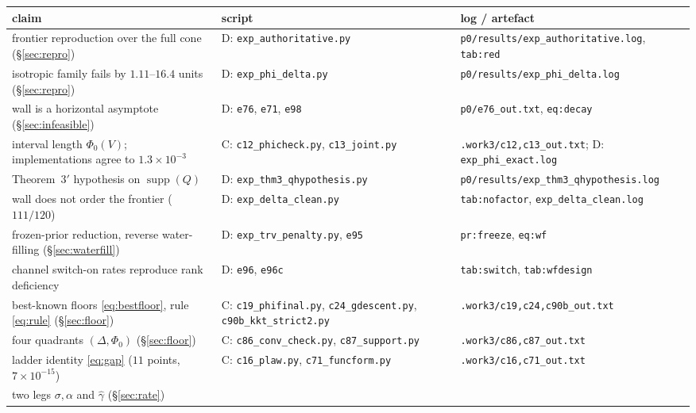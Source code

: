 \documentclass[journal]{IEEEtran}
\theoremstyle{remark}
\begin{document}
\begin{table}[t]\centering\scriptsize
\begin{tabular}{@{}>{\raggedright\arraybackslash}p{5.2cm}>{\raggedright\arraybackslash}p{5.6cm}>{\raggedright\arraybackslash}p{5.8cm}@{}}
\toprule
claim & script & log / artefact \\
\midrule
frontier reproduction over the full cone (\S\ref{sec:repro})
  & D: \texttt{exp\_authoritative.py}
  & \texttt{p0/results/exp\_authoritative.log}, \texttt{tab:red} \\
isotropic family fails by $1.11$--$16.4$ units (\S\ref{sec:repro})
  & D: \texttt{exp\_phi\_delta.py}
  & \texttt{p0/results/exp\_phi\_delta.log} \\
wall is a horizontal asymptote (\S\ref{sec:infeasible})
  & D: \texttt{e76}, \texttt{e71}, \texttt{e98}
  & \texttt{p0/e76\_out.txt}, \texttt{eq:decay} \\
interval length $\Phi_0(V)$; implementations agree to $1.3\times10^{-3}$
  & C: \texttt{c12\_phicheck.py}, \texttt{c13\_joint.py}
  & \texttt{.work3/c12,c13\_out.txt}; D: \texttt{exp\_phi\_exact.log} \\
Theorem~3$'$ hypothesis on $\operatorname{supp}(Q)$
  & D: \texttt{exp\_thm3\_qhypothesis.py}
  & \texttt{p0/results/exp\_thm3\_qhypothesis.log} \\
wall does not order the frontier ($111/120$)
  & D: \texttt{exp\_delta\_clean.py}
  & \texttt{tab:nofactor}, \texttt{exp\_delta\_clean.log} \\
frozen-prior reduction, reverse water-filling (\S\ref{sec:waterfill})
  & D: \texttt{exp\_trv\_penalty.py}, \texttt{e95}
  & \texttt{pr:freeze}, \texttt{eq:wf} \\
channel switch-on rates reproduce rank deficiency
  & D: \texttt{e96}, \texttt{e96c}
  & \texttt{tab:switch}, \texttt{tab:wfdesign} \\
best-known floors \eqref{eq:bestfloor}, rule \eqref{eq:rule} (\S\ref{sec:floor})
  & C: \texttt{c19\_phifinal.py}, \texttt{c24\_gdescent.py}, \texttt{c90b\_kkt\_strict2.py}
  & \texttt{.work3/c19,c24,c90b\_out.txt} \\
four quadrants $(\Delta,\Phi_0)$ (\S\ref{sec:floor})
  & C: \texttt{c86\_conv\_check.py}, \texttt{c87\_support.py}
  & \texttt{.work3/c86,c87\_out.txt} \\
ladder identity \eqref{eq:gap} ($11$ points, $7\times10^{-15}$)
  & C: \texttt{c16\_plaw.py}, \texttt{c71\_funcform.py}
  & \texttt{.work3/c16,c71\_out.txt} \\
two legs $\sigma,\alpha$ and $\hat\gamma$ (\S\ref{sec:rate})

\end{tabular}
\end{table}
\end{document}
